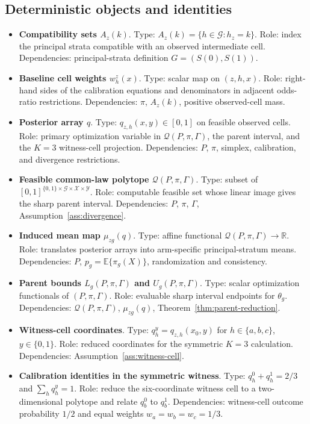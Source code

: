 \documentclass[11pt]{article}
\newcommand{\E}{\mathbb{E}}
\theoremstyle{definition}
\theoremstyle{plain}
\theoremstyle{remark}
\begin{document}
\subsection*{Deterministic objects and identities}
\begin{itemize}[leftmargin=2em]
  \item \textbf{Compatibility sets \(A_z(k)\)}.  Type: \(A_z(k)=\{h\in\mathcal G:h_z=k\}\).  Role: index the principal strata compatible with an observed intermediate cell.  Dependencies: principal-strata definition \(G=(S(0),S(1))\).
  \item \textbf{Baseline cell weights \(w_h^z(x)\)}.  Type: scalar map on \((z,h,x)\).  Role: right-hand sides of the calibration equations and denominators in adjacent odds-ratio restrictions.  Dependencies: \(\pi\), \(A_z(k)\), positive observed-cell mass.
  \item \textbf{Posterior array \(q\)}.  Type: \(q_{z,h}(x,y)\in[0,1]\) on feasible observed cells.  Role: primary optimization variable in \(\mathcal Q(P,\pi,\Gamma)\), the parent interval, and the \(K=3\) witness-cell projection.  Dependencies: \(P\), \(\pi\), simplex, calibration, and divergence restrictions.
  \item \textbf{Feasible common-law polytope \(\mathcal Q(P,\pi,\Gamma)\)}.  Type: subset of \([0,1]^{\{0,1\}\times\mathcal G\times\mathcal X\times\mathcal Y}\).  Role: computable feasible set whose linear image gives the sharp parent interval.  Dependencies: \(P\), \(\pi\), \(\Gamma\), Assumption~\ref{ass:divergence}.
  \item \textbf{Induced mean map \(\mu_{zg}(q)\)}.  Type: affine functional \(\mathcal Q(P,\pi,\Gamma)\to\mathbb R\).  Role: translates posterior arrays into arm-specific principal-stratum means.  Dependencies: \(P\), \(p_g=\E\{\pi_g(X)\}\), randomization and consistency.
  \item \textbf{Parent bounds \(L_g(P,\pi,\Gamma)\) and \(U_g(P,\pi,\Gamma)\)}.  Type: scalar optimization functionals of \((P,\pi,\Gamma)\).  Role: evaluable sharp interval endpoints for \(\theta_g\).  Dependencies: \(\mathcal Q(P,\pi,\Gamma)\), \(\mu_{zg}(q)\), Theorem~\ref{thm:parent-reduction}.
  \item \textbf{Witness-cell coordinates}.  Type: \(q_h^y=q_{z,h}(x_0,y)\) for \(h\in\{a,b,c\}\), \(y\in\{0,1\}\).  Role: reduced coordinates for the symmetric \(K=3\) calculation.  Dependencies: Assumption~\ref{ass:witness-cell}.
  \item \textbf{Calibration identities in the symmetric witness}.  Type: \(q_h^0+q_h^1=2/3\) and \(\sum_{h}q_h^y=1\).  Role: reduce the six-coordinate witness cell to a two-dimensional polytope and relate \(q_b^0\) to \(q_b^1\).  Dependencies: witness-cell outcome probability \(1/2\) and equal weights \(w_a=w_b=w_c=1/3\).

\end{itemize}
\end{document}
